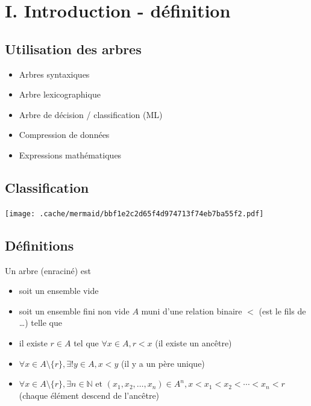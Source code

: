 \hypertarget{i.-introduction---duxe9finition}{%
\section{I. Introduction -
définition}\label{i.-introduction---duxe9finition}}

\hypertarget{utilisation-des-arbres}{%
\subsection{Utilisation des arbres}\label{utilisation-des-arbres}}

\begin{itemize}
\tightlist
\item
  Arbres syntaxiques
\item
  Arbre lexicographique
\item
  Arbre de décision / classification (ML)
\item
  Compression de données
\item
  Expressions mathématiques
\end{itemize}

\hypertarget{classification}{%
\subsection{Classification}\label{classification}}

\texttt{[image: .cache/mermaid/bbf1e2c2d65f4d974713f74eb7ba55f2.pdf]}

\hypertarget{duxe9finitions}{%
\subsection{Définitions}\label{duxe9finitions}}

Un arbre (enraciné) est

\begin{itemize}
\tightlist
\item
  soit un ensemble vide
\item
  soit un ensemble fini non vide \(A\) muni d'une relation binaire \(<\)
  (est le fils de \ldots) telle que
\item
  il existe \(r \in A\) tel que \(\forall x \in A, r < x\) (il existe un
  ancêtre)
\item
  \(\forall x \in A \setminus \{r\}, \exists ! y \in A, x < y\) (il y a
  un père unique)
\item
  \(\forall x \in A \setminus \{r\}, \exists n \in \mathbb{N} \text{ et } (x_1, x_2, \ldots, x_n) \in A^n, x < x_1 < x_2 < \cdots < x_n < r\)
  (chaque élément descend de l'ancêtre)
\end{itemize}

